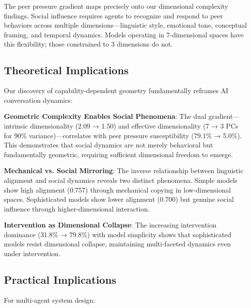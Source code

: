\documentclass[11pt,letterpaper]{article}
\newcommand{\fullReasoningPCOne}{31.8\%}
\newcommand{\noReasoningPCOne}{79.8\%}
\newcommand{\fullReasoningIntrinsicDim}{2.09}
\newcommand{\noReasoningIntrinsicDim}{1.50}
\newcommand{\fullReasoningPCANinety}{7}
\newcommand{\noReasoningPCANinety}{3}
\newcommand{\fullReasoningPeerPressure}{79.1\%}
\newcommand{\nonReasoningPeerPressure}{5.0\%}
\newcommand{\fullLinguisticAlignment}{0.700}
\newcommand{\nonLinguisticAlignment}{0.757}
\begin{document}
The peer pressure gradient maps precisely onto our dimensional complexity findings. Social influence requires agents to recognize and respond to peer behaviors across multiple dimensions—linguistic style, emotional tone, conceptual framing, and temporal dynamics. Models operating in 7-dimensional spaces have this flexibility; those constrained to 3 dimensions do not.

\subsection{Theoretical Implications}

Our discovery of capability-dependent geometry fundamentally reframes AI conversation dynamics:

\textbf{Geometric Complexity Enables Social Phenomena}: The dual gradient—intrinsic dimensionality (\fullReasoningIntrinsicDim{} → \noReasoningIntrinsicDim{}) and effective dimensionality (\fullReasoningPCANinety{} → \noReasoningPCANinety{} PCs for 90\% variance)—correlates with peer pressure susceptibility (\fullReasoningPeerPressure{} → \nonReasoningPeerPressure{}). This demonstrates that social dynamics are not merely behavioral but fundamentally geometric, requiring sufficient dimensional freedom to emerge.

\textbf{Mechanical vs. Social Mirroring}: The inverse relationship between linguistic alignment and social dynamics reveals two distinct phenomena. Simple models show high alignment (\nonLinguisticAlignment{}) through mechanical copying in low-dimensional spaces. Sophisticated models show lower alignment (\fullLinguisticAlignment{}) but genuine social influence through higher-dimensional interaction.

\textbf{Intervention as Dimensional Collapse}: The increasing intervention dominance (\fullReasoningPCOne{} → \noReasoningPCOne{}) with model simplicity shows that sophisticated models resist dimensional collapse, maintaining multi-faceted dynamics even under intervention.

\subsection{Practical Implications}

For multi-agent system design:
\end{document}
